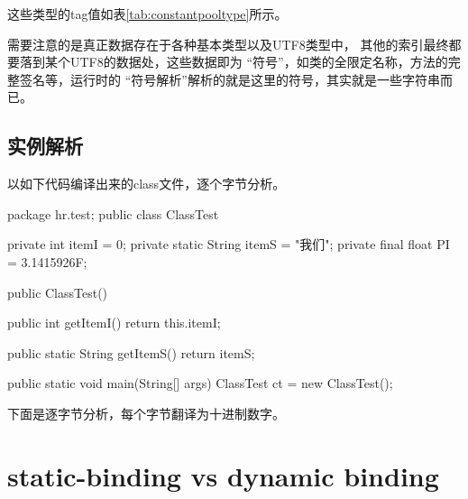 \documentclass[a4paper,11pt]{article}
\begin{document}
这些类型的tag值如表\ref{tab:constantpooltype}所示。



需要注意的是真正数据存在于各种基本类型以及UTF8类型中，
其他的索引最终都要落到某个UTF8的数据处，这些数据即为
“符号”，如类的全限定名称，方法的完整签名等，运行时的
“符号解析”解析的就是这里的符号，其实就是一些字符串而已。

\subsection[实例解析]{实例解析}
以如下代码编译出来的class文件，逐个字节分析。

\begin{javacode}
package hr.test;
public class ClassTest {
  private int itemI = 0;
  private static String itemS = "我们";
  private final float PI = 3.1415926F;

  public ClassTest() { }

  public int getItemI() {
    return this.itemI;
  }

  public static String getItemS() {
    return itemS;
  }

  public static void main(String[] args) {
    ClassTest ct = new ClassTest();
  }
}
\end{javacode}

下面是逐字节分析，每个字节翻译为十进制数字。




\section[static-binding vs dynamic binding]{static-binding vs dynamic binding}
\end{document}
